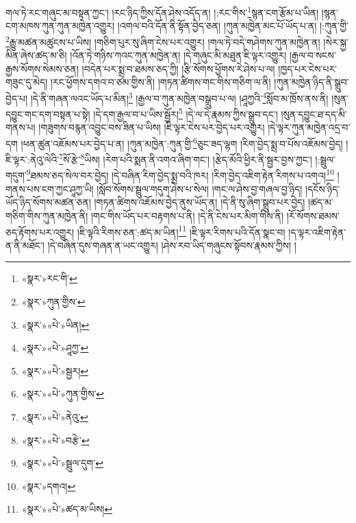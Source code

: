 གལ་ཏེ་རང་གཞུང་མ་བསྟན་ཀྱང་། །རང་ཉིད་ཀྱིས་དོན་ཤེས་འདོད་ན། །:རང་གིས་\footnote{«སྣར་»རང་གི་}སྙན་ངག་རྩོམ་པ་ཡིན། །སྙན་ངག་མཁས་ཀུན་ཀུན་མཁྱེན་འགྱུར། །འགལ་བའི་དོན་ནི་སྟོན་བྱེད་ཅན། །ཀུན་མཁྱེན་མང་པོ་ཡོད་པ་ན། །:ཀུན་གྱི་\footnote{«སྣར་»ཀུན་གྱིས་}རྒྱུ་མཚན་མཚུངས་པ་ཡིས། །གཅིག་པུར་སུ་ཞིག་ངེས་པར་འགྱུར། །གལ་ཏེ་བདེ་གཤེགས་ཀུན་མཁྱེན་ན། །སེར་སྐྱ་མིན་ཞེས་ཚད་མ་ཅི། །འོན་ཏེ་གཉིས་ཀའང་ཀུན་མཁྱེན་ན། །དེ་གཞུང་མི་མཐུན་ཇི་ལྟར་འགྱུར། །རྒྱལ་བ་སངས་རྒྱས་སོགས་སེམས་ཅན། །བདེན་པར་སྨྲ་བ་ཐམས་ཅད་ཀྱི། །རྩི་སོགས་ཕྱོགས་རེ་ཤེས་པ་ལ། །ཁྱད་པར་ངེས་པར་གཟུང་དུ་མེད། །རང་ཕྱོགས་དགའ་བ་ཙམ་གྱིས་ནི། །གཏན་ཚིགས་གང་གིས་གཅིག་ལ་ནི། །ཀུན་མཁྱེན་ཉིད་ནི་སྒྲུབ་བྱེད་པ། །དེ་ནི་གཞན་ལའང་ཡོད་པ་མིན།\footnote{«སྣར་»«པེ་»ཡིན།} །རྒྱལ་བ་ཀུན་མཁྱེན་བསྒྲུབ་པ་ལ། །ཤཱཀྱའི་\footnote{«སྣར་»«པེ་»ཤཱཀྱ་}སློབ་མ་ཁྲོས་ནས་ནི། །སུན་དབྱུང་གང་དག་བསྟན་པ་སྟེ། །དེ་དག་རྒྱལ་བ་པ་ཡིས་སྦྱོར།\footnote{«སྣར་»«པེ་»སྦྱར།} །དེ་ལ་དེ་རྣམས་ཀྱིས་སྒྲུབ་དང་། །སུན་དབྱུང་ཐ་དད་མི་གནས་པ། །གཟུགས་བརྙན་འབྱུང་བས་ཟིན་པ་ཡིས། །ཇི་ལྟར་ངེས་པར་བྱེད་པར་འགྱུར། །དེ་ལྟར་ཀུན་མཁྱེན་འདྲ་བ་དག །ཕན་ཚུན་འཇོམས་པར་བྱེད་པ་ན། །ཀུན་མཁྱེན་:ཀུན་གྱི་\footnote{«སྣར་»«པེ་»ཀུན་གྱིས་}ཅུང་ཟད་ལྷག །རིག་བྱེད་སྨྲ་བ་པོས་འཇོམས་བྱེད། །ཇི་ལྟར་:ནེའུ་ལེའི་\footnote{«སྣར་»«པེ་»ནེའུ་}སོ་རྩེ་\footnote{«སྣར་»«པེ་»བརྩེ་}ཡིས། །རེག་པའི་སྨན་ནི་འགའ་ཞིག་གང་། །རྩེད་མོའི་ཕྱིར་ནི་སྦྱར་བྱས་ཀྱང་། །:སྦྲུལ་གདུག་\footnote{«སྣར་»«པེ་»སྦྲུལ་དུག་}ཐམས་ཅད་སེལ་བར་བྱེད། །དེ་བཞིན་རིག་བྱེད་སྨྲ་བའི་ཁར། །རིག་བྱེད་འཇིག་རྟེན་རིགས་པ་འགའ།\footnote{«སྣར་»དགའ།} །གནས་པས་ངག་ཀྱང་ཤཱཀྱ་ཡི། །སློབ་སོགས་སྦྲུལ་གདུག་ཤེས་པ་སེལ། །གང་ལ་ཤེས་བྱ་གཞལ་བྱ་ཉིད། །དངོས་ཉིད་ཡོད་ཉིད་སོགས་མཚན་ཅན། །གཏན་ཚིགས་འཇོམས་བྱེད་ནུས་ཡོད་ན། །དེ་ནི་སུ་ཞིག་སྒྲུབ་པར་བྱེད། །ཚད་མ་གཅིག་གིས་ཀུན་མཁྱེན་ནི། །གང་གིས་ཡོད་པར་བརྟགས་པ་ནི། །དེ་ནི་ངེས་པར་མིག་གིས་ནི། །རོ་སོགས་ཐམས་ཅད་རྟོགས་པར་འགྱུར། །ཇི་ལྟའི་རིགས་ཅན་:ཚད་མ་ཡིན།\footnote{«སྣར་»«པེ་»ཚད་མ་ཡིས།} །ཇི་ལྟར་རིགས་པའི་དོན་སྣང་བ། །ད་ལྟར་འཇིག་རྟེན་ན་ནི་མཐོང་། །དེ་བཞིན་དུས་གཞན་ན་ཡང་འགྱུར། །ཤེས་རབ་ཡིད་གཞུངས་སྟོབས་རྣམས་ཀྱིས། །

